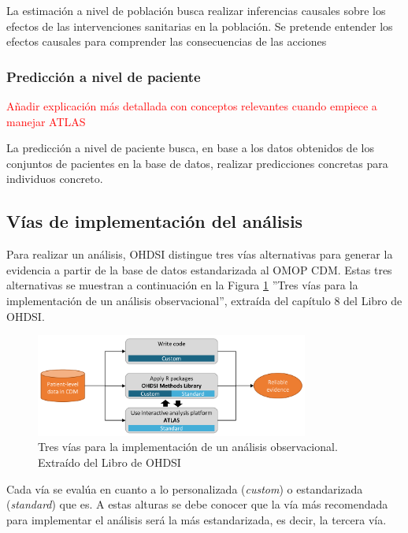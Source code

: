 La estimación a nivel de población busca realizar inferencias causales sobre los efectos de las intervenciones sanitarias en la población. Se pretende entender los efectos causales para comprender las consecuencias de las acciones

\subsubsection{Predicción a nivel de paciente}

\textcolor{red}{Añadir explicación más detallada con conceptos relevantes cuando empiece a manejar ATLAS}

La predicción a nivel de paciente busca, en base a los datos obtenidos de los conjuntos de pacientes en la base de datos, realizar predicciones concretas para individuos concreto.

\subsection{Vías de implementación del análisis} \label{subsec:05vias}

Para realizar un análisis, OHDSI distingue tres vías alternativas para generar la evidencia a partir de la base de datos estandarizada al OMOP CDM. Estas tres alternativas se muestran a continuación en la Figura \ref{fig:analysisImplementations} ''Tres vías para la implementación de un análisis observacional'', extraída del capítulo 8 del Libro de OHDSI.

\begin{figure}[H]
    \centering
    \includegraphics[width=0.80\textwidth]{figures/analysisImplementations.png}
     \caption{Tres vías para la implementación de un análisis observacional. Extraído del Libro de OHDSI \cite{OHDSIbook}}
    \label{fig:analysisImplementations}
\end{figure}

Cada vía se evalúa en cuanto a lo personalizada (\textit{custom}) o estandarizada (\textit{standard}) que es. A estas alturas se debe conocer que la vía más recomendada para implementar el análisis será la más estandarizada, es decir, la tercera vía.

